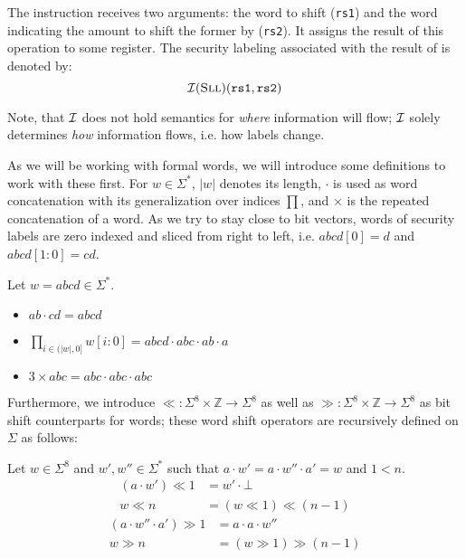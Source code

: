 \begin{example}
    The  instruction receives two arguments: the word to shift (\texttt{rs1}) and the word indicating the amount to shift the former by (\texttt{rs2}).
    It assigns the result of this operation to some register.
    The security labeling associated with the result of  is denoted by:
    \begin{equation*}
        \mathcal{I}(\textsc{Sll})(\texttt{rs1}, \texttt{rs2})
    \end{equation*}

    Note, that $ \mathcal{I} $ does not hold semantics for \textit{where} information will flow; $ \mathcal{I} $ solely determines \textit{how} information flows, i.e. how labels change.
\end{example}

As we will be working with formal words, we will introduce some definitions to work with these first.
For $ w  \in \Sigma^* $, $ |w| $ denotes its length,
$ \cdot $ is used as word concatenation with its generalization over indices $ \prod $, and $ \times $ is the repeated concatenation of a word.
As we try to stay close to bit vectors, words of security labels are zero indexed and sliced from right to left, i.e. $ abcd[0] = d $ and $ abcd[1:0] = cd $.

\begin{example}
    Let $ w = abcd \in \Sigma^* $.
    \begin{itemize}
        \item $ ab \cdot cd = abcd $
        \item $ \prod_{i \in (|w|, 0]} w[i:0] = abcd \cdot abc \cdot ab \cdot a $
        \item $ 3 \times abc = abc \cdot abc \cdot abc $
    \end{itemize}
\end{example}

Furthermore, we introduce $ \ll : \Sigma^8 \times \mathbb{Z} \rightarrow \Sigma^8 $ as well as $ \gg : \Sigma^8 \times \mathbb{Z} \rightarrow \Sigma^8 $ as bit shift counterparts for words; these word shift operators are recursively defined on $ \Sigma $ as follows:

Let $ w \in \Sigma^8 $ and $ w', w'' \in \Sigma^* $ such that $ a \cdot w' = a \cdot w'' \cdot a' = w $ and $ 1 < n $.
\begin{align*}
    (a \cdot w') \ll 1 &= w' \cdot \bot \\
    w \ll n &= (w \ll 1) \ll (n - 1)
\end{align*}
\begin{align*}
    (a \cdot w'' \cdot a') \gg 1 &= a \cdot a \cdot w'' \\
    w \gg n &= (w \gg 1) \gg (n - 1)
\end{align*}

